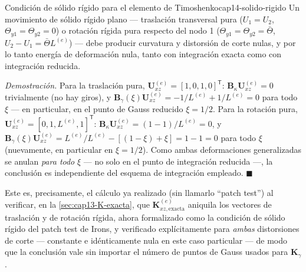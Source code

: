 \begin{teorema}{Condición de sólido rígido para el elemento de Timoshenko}{cap14-solido-rigido}
Un movimiento de sólido rígido plano --- traslación transversal pura ($U_1=U_2$, $\Theta_{y1}=\Theta_{y2}=0$) o rotación rígida pura respecto del nodo 1 ($\Theta_{y1}=\Theta_{y2}=\bar\Theta$, $U_2-U_1=\bar\Theta L^{(e)}$) --- debe producir curvatura y distorsión de corte nulas, y por lo tanto energía de deformación nula, tanto con integración exacta como con integración reducida.

\emph{Demostración.} Para la traslación pura, $\bm U^{(e)}_{xz}=[1,0,1,0]^{\mathsf T}$: $\bm B_\kappa\bm U^{(e)}_{xz}=0$ trivialmente (no hay giros), y $\bm B_\gamma(\xi)\bm U^{(e)}_{xz}=-1/L^{(e)}+1/L^{(e)}=0$ para todo $\xi$ --- en particular, en el punto de Gauss reducido $\xi=1/2$. Para la rotación pura, $\bm U^{(e)}_{xz}=[0,1,L^{(e)},1]^{\mathsf T}$: $\bm B_\kappa\bm U^{(e)}_{xz}=(1-1)/L^{(e)}=0$, y $\bm B_\gamma(\xi)\bm U^{(e)}_{xz}=L^{(e)}/L^{(e)}-[(1-\xi)+\xi]=1-1=0$ para todo $\xi$ (nuevamente, en particular en $\xi=1/2$). Como ambas deformaciones generalizadas se anulan \emph{para todo} $\xi$ --- no solo en el punto de integración reducida ---, la conclusión es independiente del esquema de integración empleado. $\blacksquare$
\end{teorema}

Este es, precisamente, el cálculo ya realizado (sin llamarlo ``patch test'') al verificar, en la \cref{sec:cap13-K-exacta}, que $\bm K^{(e)}_{xz,\text{exacta}}$ aniquila los vectores de traslación y de rotación rígida, ahora formalizado como la condición de sólido rígido del patch test de Irons, y verificado explícitamente para \emph{ambas} distorsiones de corte --- constante e idénticamente nula en este caso particular --- de modo que la conclusión vale sin importar el número de puntos de Gauss usados para $\bm K_\gamma$.

